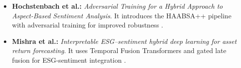 \documentclass{article}
\begin{document}
\begin{itemize}
\textbf{ten Haaf et al.:} \textit{WEB-SOBA: Word Embeddings-Based Semi-automatic Ontology Building for Aspect-Based Sentiment Classification}. This paper introduces the SOBA methodology for semi-automated ontology building  \parencite{fenna_ten_haaf_fa5d07dd}.\item 

\textbf{Hochstenbach et al.:} \textit{Adversarial Training for a Hybrid Approach to Aspect-Based Sentiment Analysis}. It introduces the HAABSA++ pipeline with adversarial training for improved robustness  \parencite{ron_hochstenbach_af02a01a}.\item 

\textbf{Mishra et al.:} \textit{Interpretable ESG–sentiment hybrid deep learning for asset return forecasting}. It uses Temporal Fusion Transformers and gated late fusion for ESG-sentiment integration  \parencite{s_k__mishra_193adeb9}.
\end{itemize}
\end{document}
